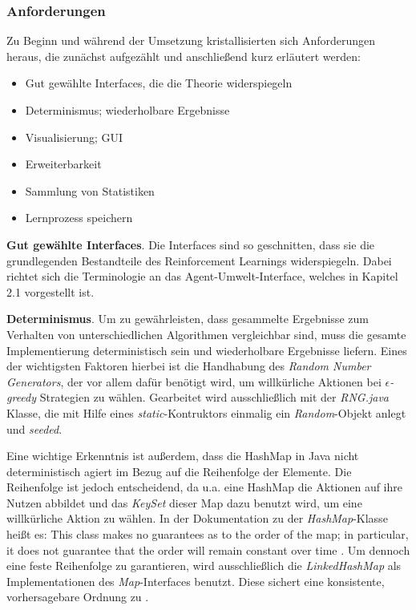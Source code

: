 

\subsubsection{Anforderungen}
Zu Beginn und während der Umsetzung kristallisierten sich Anforderungen heraus, die zunächst aufgezählt und anschließend kurz erläutert werden:

\begin{itemize}
    \item Gut gewählte Interfaces, die die Theorie widerspiegeln
    \item Determinismus; wiederholbare Ergebnisse
    \item Visualisierung; GUI
    \item Erweiterbarkeit
    \item Sammlung von Statistiken
    \item Lernprozess speichern
\end{itemize}

\textbf{Gut gewählte Interfaces}. Die Interfaces sind so geschnitten, dass sie die grundlegenden Bestandteile des Reinforcement Learnings widerspiegeln. Dabei richtet sich die Terminologie an das Agent-Umwelt-Interface, welches in Kapitel 2.1 vorgestellt ist. 
\par 
\textbf{Determinismus}. Um zu gewährleisten, dass gesammelte Ergebnisse zum Verhalten von unterschiedlichen Algorithmen vergleichbar sind, muss die gesamte Implementierung deterministisch sein und wiederholbare Ergebnisse liefern. Eines der wichtigsten Faktoren hierbei ist die Handhabung des \textit{Random Number Generators}, der vor allem dafür benötigt wird, um \glqq willkürliche\grqq{} Aktionen bei $\epsilon$\textit{-greedy} Strategien zu wählen. Gearbeitet wird ausschließlich mit der \textit{RNG.java} Klasse, die mit Hilfe eines \textit{static}-Kontruktors einmalig ein \textit{Random}-Objekt anlegt und \textit{seeded}.
\par 
Eine wichtige Erkenntnis ist außerdem, dass die HashMap in Java nicht deterministisch agiert im Bezug auf die Reihenfolge der Elemente. Die Reihenfolge ist jedoch entscheidend, da u.a. eine HashMap die Aktionen auf ihre Nutzen abbildet und das \textit{KeySet} dieser Map dazu benutzt wird, um eine willkürliche Aktion zu wählen. In der Dokumentation zu der \textit{HashMap}-Klasse heißt es: \glqq This class makes no guarantees as to the order of the map; in particular, it does not guarantee that the order will remain constant over time \grqq{}\cite{hashmap}.
Um dennoch eine feste Reihenfolge zu garantieren, wird ausschließlich die \textit{LinkedHashMap} als Implementationen des \textit{Map}-Interfaces benutzt. Diese sichert eine konsistente, vorhersagebare Ordnung zu \cite[]{linkedHashMap}.

